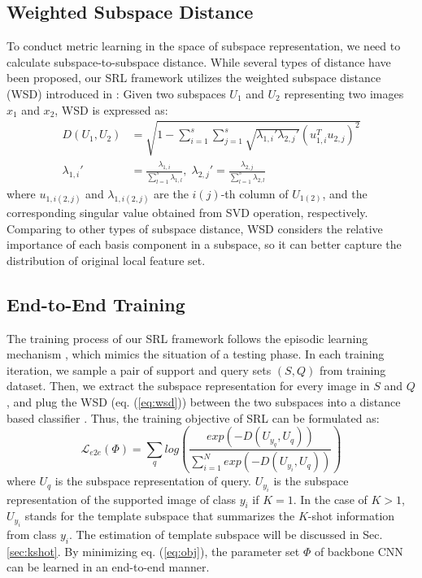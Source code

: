 \subsection{Weighted Subspace Distance}
To conduct metric learning in the space of subspace representation, we need to calculate subspace-to-subspace distance.
While several types of distance have been proposed, our SRL framework utilizes the weighted subspace distance (WSD) introduced in \cite{li2009weighted}:
Given two subspaces $U_1$ and $U_2$ representing two images $x_1$ and $x_2$, WSD is expressed as:
\begin{equation}
\begin{split}
    D(U_1, U_2) & = \sqrt{1 - \sum_{i=1}^s \sum_{j=1}^s \sqrt{ \lambda_{1,i}' \lambda_{2,j}' } (u_{1,i}^Tu_{2,j})^2 } \\
    \lambda_{1,i}' & = \frac{ \lambda_{1,i} }{ \sum_{l=1}^{s} \lambda_{1,l}}, \; \lambda_{2,j}'  = \frac{ \lambda_{2,j} }{ \sum_{l=1}^{s} \lambda_{2,l}}
\end{split}
\label{eq:wsd}
\end{equation}
where $u_{1,i(2,j)}$ and $\lambda_{1,i(2,j)}$ are the $i(j)$-th column of $U_{1(2)}$, and the corresponding singular value obtained from SVD operation, respectively.
Comparing to other types of subspace distance, WSD considers the relative importance of each basis component in a subspace, so it can better capture the distribution of original local feature set.

\subsection{End-to-End Training}
The training process of our SRL framework follows the episodic learning mechanism \cite{vinyals2016matching}, which mimics the situation of a testing phase.
In each training iteration, we sample a pair of support and query sets $(S,Q)$ from training dataset.
Then, we extract the subspace representation for every image in $S$ and $Q$, and plug the WSD (eq. (\ref{eq:wsd})) between the two subspaces into a distance based classifier \cite{chen2019closer}.
Thus, the training objective of SRL can be formulated as: 
\begin{equation}
    \mathcal{L}_{e2e}(\Phi) = \sum_q log \left( \frac{exp(-D(U_{y_q}, U_q))}{\sum_{i=1}^N exp(-D(U_{y_i},U_q))} \right)
\label{eq:obj}
\end{equation}
where $U_q$ is the subspace representation of query. $U_{y_i}$ is the subspace representation of the supported image of class $y_i$ if $K=1$. 
In the case of $K>1$, $U_{y_i}$ stands for the template subspace that summarizes the $K$-shot information from class $y_i$.
The estimation of template subspace will be discussed in Sec. \ref{sec:kshot}.
By minimizing eq. (\ref{eq:obj}), the parameter set $\Phi$ of backbone CNN can be learned in an end-to-end manner.


